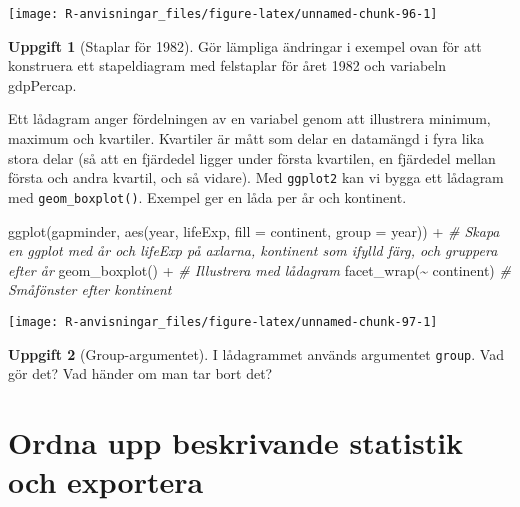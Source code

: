 \documentclass[
]{book}
\newenvironment{Shaded}{\begin{snugshade}}{\end{snugshade}}
\newcommand{\AttributeTok}[1]{\textcolor[rgb]{0.77,0.63,0.00}{#1}}
\newcommand{\CommentTok}[1]{\textcolor[rgb]{0.56,0.35,0.01}{\textit{#1}}}
\newcommand{\FunctionTok}[1]{\textcolor[rgb]{0.00,0.00,0.00}{#1}}
\newcommand{\NormalTok}[1]{#1}
\newcommand{\SpecialCharTok}[1]{\textcolor[rgb]{0.00,0.00,0.00}{#1}}
\theoremstyle{definition}
\theoremstyle{definition}
\theoremstyle{definition}
\newtheorem{exercise}{Uppgift}[chapter]
\theoremstyle{definition}
\theoremstyle{remark}
\begin{document}
\begin{center}\texttt{[image: R-anvisningar\_files/figure-latex/unnamed-chunk-96-1]} \end{center}

\begin{exercise}[Staplar för 1982]
Gör lämpliga ändringar i exempel ovan för att konstruera ett stapeldiagram med felstaplar för året 1982 och variabeln gdpPercap.
\end{exercise}

Ett lådagram anger fördelningen av en variabel genom att illustrera minimum, maximum och kvartiler. Kvartiler är mått som delar en datamängd i fyra lika stora delar (så att en fjärdedel ligger under första kvartilen, en fjärdedel mellan första och andra kvartil, och så vidare). Med \texttt{ggplot2} kan vi bygga ett lådagram med \texttt{geom\_boxplot()}. Exempel ger en låda per år och kontinent.

\begin{Shaded}
\begin{Highlighting}[]
\FunctionTok{ggplot}\NormalTok{(gapminder, }\FunctionTok{aes}\NormalTok{(year, lifeExp, }\AttributeTok{fill =}\NormalTok{ continent, }\AttributeTok{group =}\NormalTok{ year)) }\SpecialCharTok{+}        \CommentTok{\# Skapa en ggplot med år och lifeExp på axlarna, kontinent som ifylld färg, och gruppera efter år}
  \FunctionTok{geom\_boxplot}\NormalTok{() }\SpecialCharTok{+}                                                             \CommentTok{\# Illustrera med lådagram}
  \FunctionTok{facet\_wrap}\NormalTok{(}\SpecialCharTok{\textasciitilde{}}\NormalTok{ continent)                                                      }\CommentTok{\# Småfönster efter kontinent}
\end{Highlighting}
\end{Shaded}

\begin{center}\texttt{[image: R-anvisningar\_files/figure-latex/unnamed-chunk-97-1]} \end{center}

\begin{exercise}[Group-argumentet]
I lådagrammet används argumentet \texttt{group}. Vad gör det? Vad händer om man tar bort det?
\end{exercise}

\hypertarget{ordna-upp-beskrivande-statistik-och-exportera}{%
\section{Ordna upp beskrivande statistik och exportera}\label{ordna-upp-beskrivande-statistik-och-exportera}}
\end{document}
